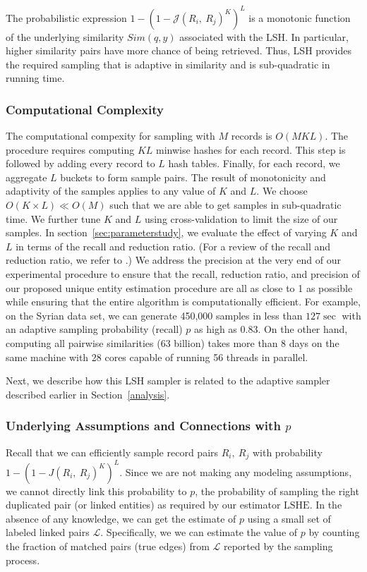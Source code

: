 \documentclass{imsart}
\begin{document}
The probabilistic expression $1 - (1-\mathcal{J}(R_i,\ R_j)^K)^L$ is a monotonic function of the underlying similarity $Sim(q,y)$ associated with the LSH. In particular, higher similarity pairs have more chance of being retrieved. Thus, LSH provides the required sampling that is adaptive in similarity and is sub-quadratic in running time.

\subsubsection{Computational Complexity}
\label{sec:CC}
The computational compexity for sampling with $M$ records is $O(MKL)$. The procedure requires computing $KL$ minwise hashes for each record. This step is followed by adding every record to $L$ hash tables.  Finally, for each record, we aggregate $L$ buckets to form sample pairs. The result of monotonicity and adaptivity of the samples applies to any value of $K$ and $L$. We choose $O(K \times L) \ll O(M)$ such that we are able to get samples in sub-quadratic time. We further tune $K$ and $L$ using cross-validation to limit the size of our samples. In section~\ref{sec:parameterstudy}, we evaluate the effect of varying $K$ and $L$ in terms of the recall and reduction ratio. (For a review of the recall and reduction ratio, we refer to \cite{christen_2012}.) We address the precision at the very end of our experimental procedure to ensure that the recall, reduction ratio, and precision of our proposed unique entity estimation procedure are all as close to 1 as possible while ensuring that the entire algorithm is computationally efficient. For example, on the Syrian data set, we can generate 450,000 samples in less than $127 \sec$ with an adaptive sampling probability (recall) $p$ as high as $0.83$.  On the other hand, computing all pairwise similarities (63 billion) takes more than 8 days on the same machine with 28 cores capable of running 56 threads in parallel.

Next, we describe how this LSH sampler is related to the adaptive sampler described earlier in  Section~\ref{analysis}.

\subsubsection{Underlying Assumptions and Connections with $p$}
Recall that we can efficiently sample record pairs $R_i, \ R_j$ with probability $1-(1-J(R_i,\ R_j)^K)^L.$
Since we are not making any modeling assumptions, we cannot directly link this probability to $p$, the probability of sampling the right duplicated pair (or linked entities) as required by our estimator $\text{LSHE}$. In the absence of any knowledge,
we can get the estimate of $p$ using a small set of labeled linked pairs $\mathcal{L}$. Specifically, we
we can estimate the value of $p$ by counting the fraction of matched pairs (true edges) from $\mathcal{L}$ reported by the sampling process.
\end{document}
